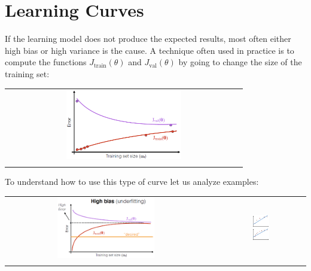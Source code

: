 \section{Learning Curves}
If the learning model does not produce the expected results, most often either high bias or high variance is the cause.
A technique often used in practice is to compute the functions $J_{\text{train}}(\theta)$ and $J_{\text{val}}(\theta)$ by going to change the size of the training set:
\begin{center}
    \begin{tabular}{c}
        \\ \includegraphics[width=0.5\textwidth]{images/LearningCurves1.png} \\ \\
    \end{tabular}
\end{center}
To understand how to use this type of curve let us analyze examples:
\begin{center}
    \begin{tabular}{c c c}
        \\ \includegraphics[width=0.5\textwidth]{images/LearningCurves2.png} & &
        \includegraphics[width=0.2\textwidth]{images/LearningCurves3.png} \\ \\
    \end{tabular}
\end{center}
